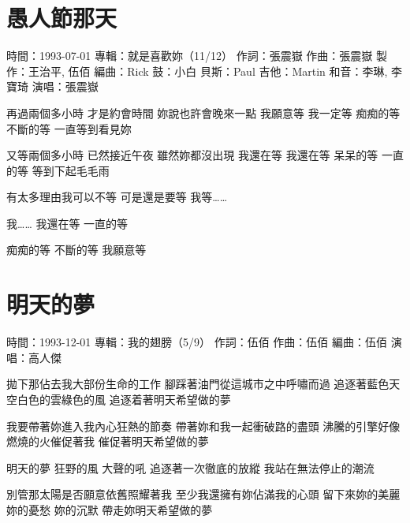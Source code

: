 \documentclass[UTF8,a4paper,oneside,twocolumn,12pt]{ctexbook}
\newcommand{\infopair}[2]{\textbullet #1：#2}
\newcommand{\zc}[1][伍佰]{\infopair{作詞}{#1}}
\newcommand{\zq}[1][伍佰]{\infopair{作曲}{#1}}
\newcommand{\bq}[1][伍佰]{\infopair{編曲}{#1}}
\newcommand{\zj}[1]{\infopair{專輯}{#1}}
\newcommand{\zz}[1]{\infopair{製作}{#1}}
\newcommand{\sj}[1]{\infopair{時間}{#1}}
\newenvironment{info}{\begin{flushleft}\kaishu
	}
	{\end{flushleft}\normalsize\yahei\par}
\newenvironment{lyric}{
	}
{}
\begin{document}
\section{愚人節那天}
\begin{info}
	\sj{1993-07-01}
	\zj{就是喜歡妳（11/12）}
	\zc[張震嶽]
	\zq[張震嶽]
	\zz{王治平, 伍佰}
	\bq[Rick]
	\infopair{鼓}{小白}
	\infopair{貝斯}{Paul}
	\infopair{吉他}{Martin}
	\infopair{和音}{李琳, 李寶琦}
	\infopair{演唱}{張震嶽}
\end{info}
\begin{lyric}
	再過兩個多小時 才是約會時間
	妳說也許會晚來一點
	我願意等
	我一定等 痴痴的等 不斷的等
	一直等到看見妳

	又等兩個多小時 已然接近午夜
	雖然妳都沒出現
	我還在等
	我還在等 呆呆的等 一直的等
	等到下起毛毛雨

	有太多理由我可以不等
	可是還是要等
	我等……

	我……
	我還在等
	一直的等

	痴痴的等 不斷的等
	我願意等
\end{lyric}

\section{明天的夢}
\begin{info}
	\sj{1993-12-01}
	\zj{我的翅膀（5/9）}
	\zc
	\zq
	\bq
	\infopair{演唱}{高人傑}
\end{info}
\begin{lyric}
	拋下那佔去我大部份生命的工作
	腳踩著油門從這城市之中呼嘯而過
	追逐著藍色天空白色的雲綠色的風
	追逐着著明天希望做的夢

	我要帶著妳進入我內心狂熱的節奏
	帶著妳和我一起衝破路的盡頭
	沸騰的引擎好像燃燒的火催促著我
	催促著明天希望做的夢

	明天的夢 狂野的風 大聲的吼
	追逐著一次徹底的放縱
	我站在無法停止的潮流

	別管那太陽是否願意依舊照耀著我
	至少我還擁有妳佔滿我的心頭
	留下來妳的美麗 妳的憂愁 妳的沉默
	帶走妳明天希望做的夢
\end{lyric}
\end{document}
